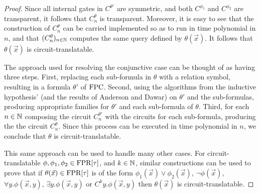 \documentclass[../paper.tex]{subfiles}
\begin{document}
\begin{proof}
  Since all internal gates in $C^{\theta'}$ are symmetric, and both $C^{\phi_1}$
  and $C^{\phi_2}$ are transparent, it follows that $C^{\theta}_n$ is
  transparent. Moreover, it is easy to see that the construction of
  $C^{\theta}_n$ can be carried implemented so as to run in time polynomial in
  $n$, and that $(C^{\theta}_n)_{n \in \mathbb{N}}$ computes the same query defined
  by $\theta(\vec{x})$. It follows that $\theta(\vec{x})$ is
  circuit-translatable.
  

  The approach used for resolving the conjunctive case can be thought of as
  having three steps. First, replacing each sub-formula in $\theta$ with a
  relation symbol, resulting in a formula $\theta'$ of $\text{\upshape FPC}$. Second, using the
  algorithms from the inductive hypothesis' (and the results of Anderson and
  Dawar) on $\theta'$ and the sub-formulas, producing appropriate families for
  $\theta'$ and each sub-formula of $\theta$. Third, for each $n \in \mathbb{N}$
  composing the circuit $C^{\theta'}_n$ with the circuits for each sub-formula,
  producing the the circuit $C^{\theta}_n$. Since this process can be executed
  in time polynomial in $n$, we conclude that $\theta$ is circuit-translatable.
  
  This same approach can be used to handle many other cases. For
  circuit-translatable $\phi, \phi_1, \phi_2 \in \text{\upshape FPR}[\tau]$, and $k \in \mathbb{N}$,
  similar constructions can be used to prove that if $\theta(\vec{x}) \in
  \text{\upshape FPR}[\tau]$ is of the form $\phi_1(\vec{x}) \lor \phi_2(\vec{x})$, $\neg
  \phi(\vec{x})$, $\forall y. \phi (\vec{x}, y)$, $\exists y. \phi (\vec{x}, y)$
  or $C^k y. \phi(\vec{x}, y)$ then $\theta(\vec{x})$ is circuit-translatable.


\end{proof}
\end{document}
